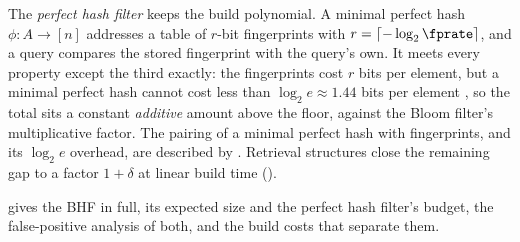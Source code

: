 The \emph{perfect hash filter} keeps the
build polynomial. A minimal perfect hash $\phi : A \to [n]$ addresses a
table of $r$-bit fingerprints with $r = \lceil -\log_2 \fprate
\rceil$, and a query compares the stored fingerprint with the query's
own. It meets every property except the third exactly: the
fingerprints cost $r$ bits per element, but a minimal perfect hash
cannot cost less than $\log_2 e \approx 1.44$ bits per element
\parencite{fredman-komlos-1984}, so the total sits a constant
\emph{additive} amount above the floor, against the Bloom filter's
multiplicative factor. The pairing of a minimal perfect hash with
fingerprints, and its $\log_2 e$ overhead, are described by
\textcite[Sec.~1]{dietzfelbinger-pagh-2008}. Retrieval structures close
the remaining gap to a factor $1 + \delta$ at linear build time
().

 gives the BHF in full,
 its expected size and the perfect hash
filter's budget,  the false-positive analysis of
both, and  the build costs that separate
them.
